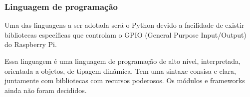 \subsubsection{Linguagem de programação}

Uma das linguagens a ser adotada será o Python devido a facilidade de existir bibliotecas específicas que controlam o GPIO (General Purpose Input/Output) do Raspberry Pi.

Essa linguagem é uma linguagem de programação de alto nível, interpretada, orientada a objetos, de tipagem dinâmica. Tem uma sintaxe consisa e clara, juntamente com bibliotecas com recursos poderosos. Os módulos e frameworks ainda não foram decididos.
